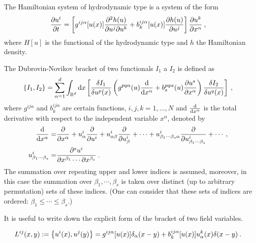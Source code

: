 \begin{definition} \label{def:hamiltonian-system}
    The Hamiltonian system of hydrodynamic type is a system of the form
        \begin{align}
            \frac{\partial u^i}{\partial t} = 
            \left[ g^{ij \alpha} [u(x)] \frac{\partial^2 h(u)}{\partial u^j \partial u^k} + b_k^{ij \alpha} [u(x)] \frac{\partial h(u)}{\partial u^j} \right] \frac{\partial u^k}{\partial x^\alpha} \:, \label{eq:Hamiltonian-system-of-h-t}
        \end{align}
        where $H[u]$ is the functional of the hydrodynamic type and $h$ the Hamiltonian density.
\end{definition}

\begin{definition}
    The Dubrovin-Novikov bracket of two functionals $I_1$ a $I_2$ is defined as
        \begin{align}
            \left \lbrace I_1,I_2 \right \rbrace = \sum_{\alpha = 1}^ d \int_{\mathbb{R}^d} \mathrm{d} x 
            \left[ \frac{\delta I_1}{\delta u^p(x)} \left( g^{pq \alpha}(u) \frac{\mathrm{d}}{\mathrm{d}x^\alpha} + b^{pq\alpha}_s(u) \frac{\partial u^s}{\partial x^\alpha} \right) \frac{\delta I_2}{\delta u^q(x)} \right] \:, \label{eq:Dubrovin-Novikov bracket}
        \end{align}
    where $g^{ij \alpha}$ and $b_k^{ij \alpha}$ are certain functions, $i,j,k = 1, \dots, N$ and $\frac{\mathrm{d}}{\mathrm{d}x^\alpha}$ is the total derivative with respect to the independent variable $x^\alpha$, denoted by
        \begin{align}
            \frac{\mathrm{d}}{\mathrm{d}x^\alpha} =& \frac{\partial }{\partial x^\alpha} + u^i_\alpha \frac{\partial }{\partial u^i} + u^i_{\alpha \beta} \frac{\partial }{\partial u^i_\beta} + \cdots + u^i_{\beta_1 \cdots \beta_s \alpha} \frac{\partial }{\partial u^i_{\beta_1 \cdots \beta_s}} + \cdots \:, \\
            u^i_{\beta_1 \cdots \beta_s} =& \frac{\partial ^s u^i}{\partial x^{\beta_1} \cdots \partial x^{\beta_s}} \:.
        \end{align}
    The summation over repeating upper and lower indices is assumed, moreover, in this case the summation over $\beta_1, \cdots, \beta_s$ is taken over distinct (up to arbitrary permutation) sets of these indices. (One can consider that these sets of indices are ordered: $\beta_1 \leq \cdots \leq \beta_s$.)
\end{definition}

It is useful to write down the explicit form of the bracket of two field variables.

\begin{proposition}
    \begin{align}
        L^{ij}(x,y) := \left \lbrace u^i(x), u^j(y) \right \rbrace = g^{ij \alpha} [u(x)] \delta_\alpha(x-y) + b_k^{ij \alpha} [u(x)] u_\alpha^k(x) \delta(x-y) \:.
    \end{align}
\end{proposition}

